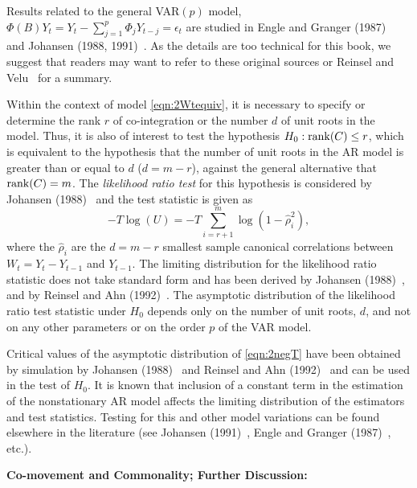 Results related to the general VAR$(p)$ model, $\Phi(B) Y_t = Y_t - \sum_{j=1}^p \Phi_j Y_{t-j} = \epsilon_t$ are studied in Engle and Granger (1987)~\cite{engle1987co} and Johansen (1988, 1991)~\cite{johansen1988statistical,johansen1991estimation}. As the details are too technical for this book, we suggest that readers may want to refer to these original sources or Reinsel and Velu~\cite{velurein} for a summary.
 

Within the context of model \eqref{eqn:2Wtequiv}, it is necessary to specify or determine the rank $r$ of co-integration or the number $d$ of unit roots in the model. Thus, it is also of interest to test the hypothesis $H_0: \operatorname{rank}(C) \leq r$, which is equivalent to the hypothesis that the number of unit roots in the AR model is greater than or equal to $d$ ($d = m - r$), against the general alternative that $\operatorname{rank}(C) = m$.  The \emph{likelihood ratio test} for this hypothesis is considered by Johansen (1988)~\cite{johansen1988statistical} and the test statistic is given as 
	\begin{equation} \label{eqn:2negT}
	- T \log (U) = - T \sum_{i=r+1}^m \log ( 1 - \hat{\rho}_i^2 ),
	\end{equation}
where the $\hat{\rho}_i$ are the $d = m - r$ smallest sample canonical correlations between $W_t = Y_t - Y_{t-1}$ and $Y_{t-1}$. The limiting distribution for the likelihood ratio statistic does not take standard form and has been derived by Johansen (1988)~\cite{johansen1988statistical}, and by Reinsel and Ahn (1992)~\cite{reinsel1992vector}. The asymptotic distribution of the likelihood ratio test statistic under $H_0$ depends only on the number of unit roots, $d$, and not on any other parameters or on the order $p$ of the VAR model.


Critical values of the asymptotic distribution of \eqref{eqn:2negT} have been obtained by simulation by Johansen (1988)~\cite{johansen1988statistical} and Reinsel and Ahn (1992)~\cite{reinsel1992vector} and can be used in the test of $H_0$. It is known that inclusion of a constant term in the estimation of the nonstationary AR model affects the limiting distribution of the estimators and test statistics. Testing for this and other model variations can be found elsewhere in the literature (see Johansen (1991)~\cite{johansen1991estimation}, Engle and Granger (1987)~\cite{engle1987co}, etc.). \twomedskip


\noindent \textbf{Co-movement and Commonality; Further Discussion:} \twomedskip


